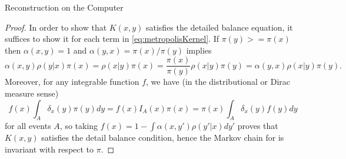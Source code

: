 \begin{chapter}{Reconstruction on the Computer}
\begin{proof}
In order to show that $K(x,y)$ satisfies the detailed balance equation, it suffices to show it for each term in \eqref{eq:metropolisKernel}.
If $\pi(y) >= \pi(x)$ then $\alpha(x,y) = 1$ and $\alpha(y,x) = \pi(x)/\pi(y)$ implies 
\begin{equation}
  \alpha(x,y)\rho(y|x)\pi(x) = \rho(x|y)\pi(x) = \frac{\pi(x)}{\pi(y)}\rho(x|y)\pi(y) = \alpha(y,x)\rho(x|y)\pi(y).
\end{equation}
Moreover, for any integrable function $f$, we have (in the distributional or Dirac measure sense)
\begin{equation}
  f(x)\int_A \delta_x(y) \pi(y)dy = f(x)I_A(x)\pi(x) = \pi(x)\int_A \delta_x(y) f(y)dy
\end{equation}
for all events $A$, so taking $f(x) = 1 - \int\alpha(x,y')\rho(y'|x)dy'$ proves that $K(x,y)$ satisfies the detail balance condition, hence the Markov chain for  is invariant with respect to $\pi$.
\end{proof}


\end{chapter}

